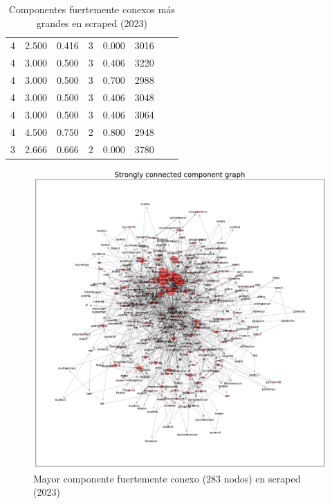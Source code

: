 \begin{table}[ht!]
\begin{tabular}{|c|c|c|c|c|c|c|c|}
        4             & 2.500           & 0.416            & 3                 & 0.000                & 3016                  \\
        4             & 3.000           & 0.500            & 3                 & 0.406                & 3220                  \\
        4             & 3.000           & 0.500            & 3                 & 0.700                & 2988                  \\
        4             & 3.000           & 0.500            & 3                 & 0.406                & 3048                  \\
        4             & 3.000           & 0.500            & 3                 & 0.406                & 3064                  \\
        4             & 4.500           & 0.750            & 2                 & 0.800                & 2948                  \\
        3             & 2.666           & 0.666            & 2                 & 0.000                & 3780                  \\
        \hline
    \end{tabular}
    \caption{Componentes fuertemente conexos más grandes en scraped (2023)}
    \label{table:scc}
\end{table}

\begin{figure}[h!]
    \begin{center}
        \includegraphics[width=1\textwidth]{img/pypi/scc1.png}
        \caption{Mayor componente fuertemente conexo (283 nodos) en scraped (2023)}
        \label{fig:scc1}
    \end{center}
\end{figure}

